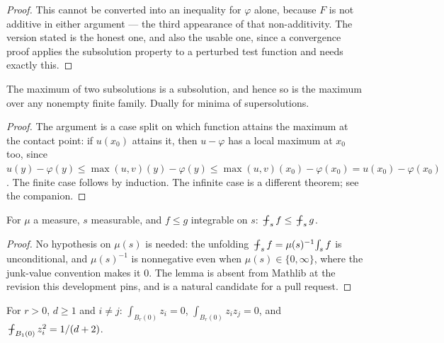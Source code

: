\begin{proof}
\leanok
This cannot be converted into an inequality for $\varphi$ alone, because $F$ is
not additive in either argument --- the third appearance of that
non-additivity. The version stated is the honest
one, and also the usable one, since a convergence proof applies the subsolution
property to a perturbed test function and needs exactly this.
\end{proof}


\begin{theorem}\label{thm:stab-max}
\leanok
{}
The maximum of two subsolutions is a subsolution, and hence so is the maximum
over any nonempty finite family. Dually for minima of supersolutions.
\end{theorem}

\begin{proof}
\leanok
The argument is a case split on which function attains the maximum at the
contact point: if $u(x_0)$ attains it, then $u - \varphi$ has a local maximum
at $x_0$ too, since
$u(y) - \varphi(y) \le \max(u,v)(y) - \varphi(y) \le \max(u,v)(x_0) -
\varphi(x_0) = u(x_0) - \varphi(x_0)$. The finite case follows by induction.
The infinite case is a different theorem; see the companion.
\end{proof}


\begin{theorem}\label{thm:avgmono}
\leanok
For $\mu$ a measure, $s$ measurable, and $f \le g$ integrable on $s$:
$\avgint_s f \le \avgint_s g$.
\end{theorem}

\begin{proof}
\leanok
No hypothesis on $\mu(s)$ is needed: the unfolding
$\avgint_s f = \mu(s)^{-1}\!\int_s f$ is unconditional, and $\mu(s)^{-1}$ is
nonnegative even when $\mu(s) \in \{0,\infty\}$, where the junk-value
convention makes it $0$.
The lemma is absent from Mathlib at the revision this development pins, and is
a natural candidate for a pull request.
\end{proof}


\begin{theorem}\label{thm:moments}
\leanok
For $r>0$, $d \ge 1$ and $i \ne j$:
$\int_{B_r(0)} z_i = 0$, $\int_{B_r(0)} z_i z_j = 0$, and
$\avgint_{B_1(0)} z_i^2 = 1/(d+2)$.
\end{theorem}

